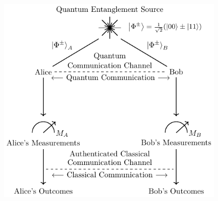 \documentclass{beamer}
\begin{document}
\begin{frame}
\begin{figure}
\begin{minipage}{0.5\textwidth}
                    \includegraphics[width=0.95\linewidth, height=0.5\textheight]{figures/presentation/pdf/entanglement-based-qkd-protocol.pdf}
                    \vspace{-1.5ex}
                    \caption{\color{blue}{Figure 1b: }}
                    \label{fig:entanglement-based-qkd-protocol}
                \end{minipage}
            \end{figure}
   
		\end{frame}
\end{document}
